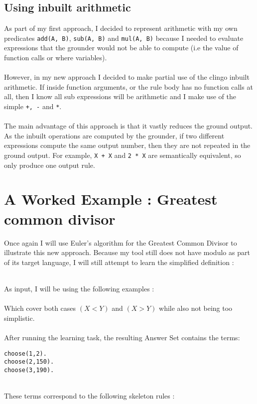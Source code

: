 \subsection{Using inbuilt arithmetic}
As part of my first approach, I decided to represent arithmetic with my own predicates \lstinline{add(A, B)}, \lstinline{sub(A, B)} and \lstinline{mul(A, B)} because I needed to evaluate expressions that the grounder would not be able to compute (i.e the value of function calls or where variables). \\ \\ %
However, in my new approach I decided to make partial use of the clingo inbuilt arithmetic. If inside function arguments, or the rule body has no function calls at all, then I know all sub expressions will be arithmetic and I make use of the simple \lstinline{+, -} and \lstinline{*}. \\ \\
The main advantage of this approach is that it vastly reduces the ground output. As the inbuilt operations are computed by the grounder, if two different expressions compute the same output number, then they are not repeated in the ground output. For example, \lstinline{X + X} and \lstinline{2 * X} are semantically equivalent, so only produce one output rule.

\section{A Worked Example : Greatest common divisor}
Once again I will use Euler's algorithm for the Greatest Common Divisor to illustrate this new approach. Because my tool still does not have modulo as part of its target language, I will still attempt to learn the simplified definition :

 
\mbox{} \\
As input, I will be using the following examples : \\

 
\mbox{} \\
Which cover both cases $(X < Y)$ and $(X > Y)$ while also not being too simplistic. \\ \\
After running the learning task, the resulting Answer Set contains the terms: \\

\begin{lstlisting}
choose(1,2).
choose(2,150).
choose(3,190).
\end{lstlisting}
\mbox{} \\
These terms correspond to the following skeleton rules : \\

